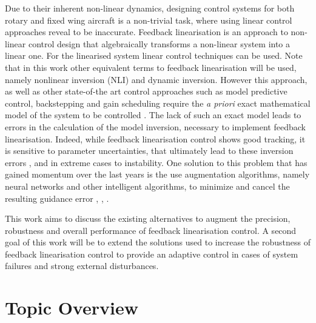 Due to their inherent non-linear dynamics, designing control systems for both rotary and fixed wing aircraft is a non-trivial task, where using linear control approaches reveal to be inaccurate. Feedback linearisation is an approach to non-linear control design that algebraically transforms a non-linear system into a linear one. For the linearised system linear control techniques can be used. Note that in this work other equivalent terms to feedback linearisation will be used, namely nonlinear inversion (NLI) and dynamic inversion. 
However this approach, as well as other state-of-the art control approaches such as model predictive control, backstepping and gain scheduling require the \textit{a priori} exact mathematical model of the system to be controlled \cite{SotA_IFCS}. The lack of such an exact model leads to errors in the calculation of the model inversion, necessary to implement feedback linearisation. Indeed, while feedback linearisation control shows good tracking, it is sensitive to parameter uncertainties, that ultimately lead to these inversion errors \cite{SotA_ControlAlgorithm}, and in extreme cases to instability. One solution to this problem that has gained momentum over the last years is the use augmentation algorithms, namely neural networks and other intelligent algorithms, to minimize and cancel the resulting guidance error  \cite{NLI+NN}, \cite{NLI+NN_IFCS}, \cite{YANG+LIN_Adaptive_Flight_Control}. 

This work aims to discuss the existing alternatives to augment the precision, robustness and overall performance of feedback linearisation control. A second goal of this work will be to extend the solutions used to increase the robustness of feedback linearisation control to provide an adaptive control in cases of system failures and strong external disturbances.

\section{Topic Overview}
\label{section:overview}

